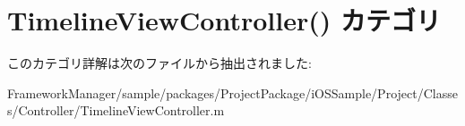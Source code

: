 \hypertarget{category_timeline_view_controller_07_08}{}\section{Timeline\+View\+Controller() カテゴリ}
\label{category_timeline_view_controller_07_08}


このカテゴリ詳解は次のファイルから抽出されました\+:\begin{DoxyCompactItemize}
\item 
Framework\+Manager/sample/packages/\+Project\+Package/i\+O\+S\+Sample/\+Project/\+Classes/\+Controller/Timeline\+View\+Controller.\+m\end{DoxyCompactItemize}
